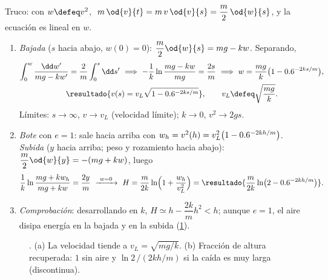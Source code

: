 \begin{resolucion}
Truco: con $w\defeq v^{2}$, $\;m\,\od{v}{t}=m\,v\,\od{v}{s}=\dfrac m2\,\od{w}{s}$, y la ecuación es lineal en $w$.
\begin{enumerate}
  \item[(a)] \emph{Bajada} ($s$ hacia abajo, $w(0)=0$): $\dfrac m2\od{w}{s}=mg-kw$. Separando,
  \begin{gather*}
    \int_{0}^{w}\frac{\dd w'}{mg-kw'}=\frac2m\int_{0}^{s}\dd s'
    \ \Longrightarrow\ -\frac1k\ln\frac{mg-kw}{mg}=\frac{2s}{m}\ \Longrightarrow\ w=\frac{mg}{k}\bigl(1-\e^{-2ks/m}\bigr),\\
    \resultado{v(s)=v_{L}\sqrt{1-\e^{-2ks/m}}},\qquad v_{L}\defeq\sqrt{\frac{mg}k} .
  \end{gather*}
  Límites: $s\to\infty$, $v\to v_{L}$ (velocidad límite); $k\to0$, $v^{2}\to2gs$.
  \item[(b)] \emph{Bote} con $e=1$: sale hacia arriba con $w_{h}=v^{2}(h)=v_{L}^{2}\bigl(1-0.6^{-2kh/m}\bigr)$.
  \emph{Subida} ($y$ hacia arriba; peso y rozamiento hacia abajo): $\dfrac m2\od{w}{y}=-(mg+kw)$, luego
  \[
    \frac1k\ln\frac{mg+kw_{h}}{mg+kw}=\frac{2y}{m}
    \ \xrightarrow{\ w=0\ }\ 
    H=\frac{m}{2k}\ln\Bigl(1+\frac{w_{h}}{v_{L}^{2}}\Bigr)
    =\resultado{\frac{m}{2k}\ln\bigl(2-\e^{-2kh/m}\bigr)} .
  \]
  \item[(c)] \emph{Comprobación}: desarrollando en $k$, $H\simeq h-\dfrac{2k}{m}h^{2}<h$; aunque $e=1$, el aire
  disipa energía en la bajada y en la subida (\cref{fig:aire}).\qedhere
\end{enumerate}
\end{resolucion}

\begin{figure}[ht]
\centering
{}
\caption{. (a) La velocidad tiende a $v_{L}=\sqrt{mg/k}$. (b) Fracción de
altura recuperada: $1$ sin aire y $\ln2\,/(2kh/m)$ si la caída es muy larga (discontinua).}
\label{fig:aire}
\end{figure}

